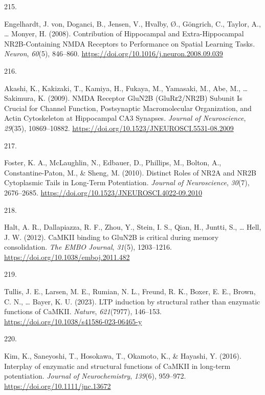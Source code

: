 \documentclass[
  11pt,
  letterpaper,
]{scrreprt}
\newlength{\cslhangindent}
\newlength{\csllabelwidth}
\newenvironment{CSLReferences}[2] %
 {\begin{list}{}{%
  \setlength{\itemindent}{0pt}
  \setlength{\leftmargin}{0pt}
  \setlength{\parsep}{0pt}
  \ifodd #1
   \setlength{\leftmargin}{\cslhangindent}
   \setlength{\itemindent}{-1\cslhangindent}
  \fi
  \setlength{\itemsep}{#2\baselineskip}}}
 {\end{list}}
\newcommand{\CSLLeftMargin}[1]{\parbox[t]{\csllabelwidth}{\strut#1\strut}}
\newcommand{\CSLRightInline}[1]{\parbox[t]{\linewidth - \csllabelwidth}{\strut#1\strut}}
\begin{document}
\begin{CSLReferences}{0}{0}
\CSLLeftMargin{215. }%
\CSLRightInline{Engelhardt, J. von, Doganci, B., Jensen, V., Hvalby, Ø.,
Göngrich, C., Taylor, A., \ldots{} Monyer, H. (2008). Contribution of
{Hippocampal} and {Extra-Hippocampal NR2B-Containing NMDA Receptors} to
{Performance} on {Spatial Learning Tasks}. \emph{Neuron}, \emph{60}(5),
846--860. \url{https://doi.org/10.1016/j.neuron.2008.09.039}}

\CSLLeftMargin{216. }%
\CSLRightInline{Akashi, K., Kakizaki, T., Kamiya, H., Fukaya, M.,
Yamasaki, M., Abe, M., \ldots{} Sakimura, K. (2009). {NMDA Receptor
GluN2B} ({GluRε2}/{NR2B}) {Subunit Is Crucial} for {Channel Function},
{Postsynaptic Macromolecular Organization}, and {Actin Cytoskeleton} at
{Hippocampal CA3 Synapses}. \emph{Journal of Neuroscience},
\emph{29}(35), 10869--10882.
\url{https://doi.org/10.1523/JNEUROSCI.5531-08.2009}}

\CSLLeftMargin{217. }%
\CSLRightInline{Foster, K. A., McLaughlin, N., Edbauer, D., Phillips,
M., Bolton, A., Constantine-Paton, M., \& Sheng, M. (2010). Distinct
{Roles} of {NR2A} and {NR2B Cytoplasmic Tails} in {Long-Term
Potentiation}. \emph{Journal of Neuroscience}, \emph{30}(7), 2676--2685.
\url{https://doi.org/10.1523/JNEUROSCI.4022-09.2010}}

\CSLLeftMargin{218. }%
\CSLRightInline{Halt, A. R., Dallapiazza, R. F., Zhou, Y., Stein, I. S.,
Qian, H., Juntti, S., \ldots{} Hell, J. W. (2012). {CaMKII} binding to
{GluN2B} is critical during memory consolidation. \emph{The EMBO
Journal}, \emph{31}(5), 1203--1216.
\url{https://doi.org/10.1038/emboj.2011.482}}

\CSLLeftMargin{219. }%
\CSLRightInline{Tullis, J. E., Larsen, M. E., Rumian, N. L., Freund, R.
K., Boxer, E. E., Brown, C. N., \ldots{} Bayer, K. U. (2023). {LTP}
induction by structural rather than enzymatic functions of {CaMKII}.
\emph{Nature}, \emph{621}(7977), 146--153.
\url{https://doi.org/10.1038/s41586-023-06465-y}}

\CSLLeftMargin{220. }%
\CSLRightInline{Kim, K., Saneyoshi, T., Hosokawa, T., Okamoto, K., \&
Hayashi, Y. (2016). Interplay of enzymatic and structural functions of
{CaMKII} in long-term potentiation. \emph{Journal of Neurochemistry},
\emph{139}(6), 959--972. \url{https://doi.org/10.1111/jnc.13672}}


\end{CSLReferences}
\end{document}
